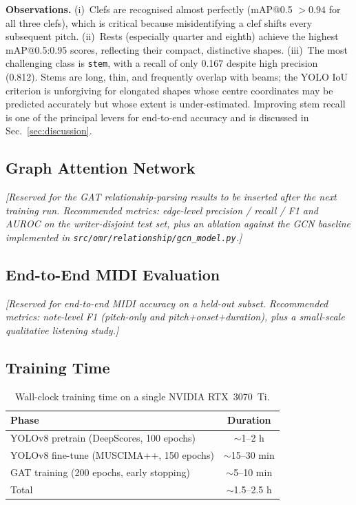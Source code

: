 \documentclass[conference]{IEEEtran}
\begin{document}
\textbf{Observations.}
(i)~Clefs are recognised almost perfectly (mAP@0.5 $> 0.94$ for all three
clefs), which is critical because misidentifying a clef shifts every
subsequent pitch.
(ii)~Rests (especially quarter and eighth) achieve the highest mAP@0.5:0.95
scores, reflecting their compact, distinctive shapes.
(iii)~The most challenging class is \texttt{stem}, with a recall of only
0.167 despite high precision (0.812). Stems are long, thin, and frequently
overlap with beams; the YOLO IoU criterion is unforgiving for elongated
shapes whose centre coordinates may be predicted accurately but whose
extent is under-estimated. Improving stem recall is one of the principal
levers for end-to-end accuracy and is discussed in
Sec.~\ref{sec:discussion}.

\subsection{Graph Attention Network}
\textit{[Reserved for the GAT relationship-parsing results to be inserted
after the next training run. Recommended metrics: edge-level precision /
recall / F1 and AUROC on the writer-disjoint test set, plus an ablation
against the GCN baseline implemented in
\texttt{src/omr/relationship/gcn\_model.py}.]}

\subsection{End-to-End MIDI Evaluation}
\textit{[Reserved for end-to-end MIDI accuracy on a held-out subset.
Recommended metrics: note-level F1 (pitch-only and pitch+onset+duration),
plus a small-scale qualitative listening study.]}

\subsection{Training Time}
\begin{table}[h]
\caption{Wall-clock training time on a single NVIDIA RTX~3070~Ti.}
\label{tab:time}
\centering
\begin{tabular}{lc}
\toprule
\textbf{Phase} & \textbf{Duration} \\
\midrule
YOLOv8 pretrain (DeepScores, 100 epochs)      & $\sim$1--2 h \\
YOLOv8 fine-tune (MUSCIMA++, 150 epochs)      & $\sim$15--30 min \\
GAT training (200 epochs, early stopping)      & $\sim$5--10 min \\
\midrule
Total                                          & $\sim$1.5--2.5 h \\
\bottomrule
\end{tabular}
\end{table}
\end{document}

